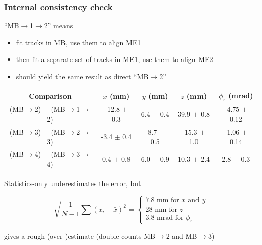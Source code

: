 \documentclass[compress]{beamer}
\begin{document}
\begin{frame}
\frametitle{Internal consistency check}
\small

``MB$\to$1$\to$2'' means
\begin{itemize}
\item fit tracks in MB, use them to align ME1
\item then fit a separate set of tracks in ME1, use them to align ME2
\item should yield the same result as direct ``MB$\to$2''
\end{itemize}

\vfill
\begin{tabular}{c | c c c c}
\scriptsize Comparison & \scriptsize $x$ (mm) & \scriptsize $y$ (mm) & \scriptsize $z$ (mm) & \scriptsize $\phi_z$ (mrad) \\\hline
\scriptsize (MB$\to$2) $-$ (MB$\to$1$\to$2) & \scriptsize -12.8 $\pm$ 0.3 & \scriptsize 6.4 $\pm$ 0.4 & \scriptsize 39.9 $\pm$ 0.8 & \scriptsize -4.75 $\pm$ 0.12 \\
\scriptsize (MB$\to$3) $-$ (MB$\to$2$\to$3) & \scriptsize -3.4 $\pm$ 0.4 & \scriptsize -8.7 $\pm$ 0.5 & \scriptsize -15.3 $\pm$ 1.0 & \scriptsize -1.06 $\pm$ 0.14 \\
\scriptsize (MB$\to$4) $-$ (MB$\to$3$\to$4) & \scriptsize 0.4 $\pm$ 0.8 & \scriptsize 6.0 $\pm$ 0.9 & \scriptsize 10.3 $\pm$ 2.4 & \scriptsize 2.8 $\pm$ 0.3 \\\hline
\end{tabular}

\vfill
Statistics-only underestimates the error, but

\[ \sqrt{\frac{1}{N-1} \sum (x_i - \bar{x})^2} = \left\{\begin{array}{l} \mbox{7.8~mm for $x$ and $y$} \\ \mbox{28~mm for $z$} \\ \mbox{3.8~mrad for $\phi_z$} \end{array}\right. \]

gives a rough (over-)estimate (double-counts MB$\to$2 and MB$\to$3)
\end{frame}
\end{document}
